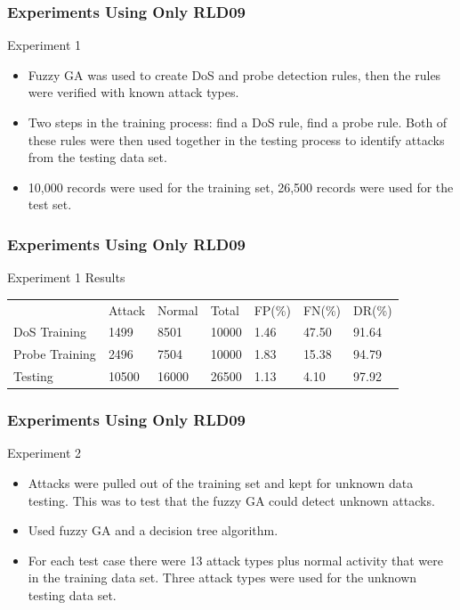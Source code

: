 \documentclass{beamer}
\begin{document}
\begin{frame}
	\frametitle{Experiments Using Only RLD09}
	Experiment 1
	\begin{itemize}
		\item Fuzzy GA was used to create DoS and probe detection rules, then the rules were verified with known attack types.
		\item Two steps in the training process: find a DoS rule, find a probe rule. Both of these rules were then used together in the testing process to identify attacks from the testing data set.
		\item 10,000 records were used for the training set, 26,500 records were used for the test set.
	\end{itemize}
\end{frame}


\begin{frame}
	\frametitle{Experiments Using Only RLD09}
	Experiment 1 Results
\begin{table}
\begin{small}
\begin{tabular}{lllllll}
 & Attack & Normal & Total & FP(\%) & FN(\%) & DR(\%)\\
DoS Training & 1499 & 8501 & 10000 & 1.46 & 47.50 & 91.64\\
Probe Training & 2496 & 7504 & 10000 & 1.83 & 15.38 & 94.79\\
Testing & 10500 & 16000 & 26500 & 1.13 & 4.10 & 97.92\\
\end{tabular}
\end{small}
\end{table}
\end{frame}


\begin{frame}
	\frametitle{Experiments Using Only RLD09}
Experiment 2
	\begin{itemize}
		\item Attacks were pulled out of the training set and kept for unknown data testing. This was to test that the fuzzy GA could detect unknown attacks.
		\item Used fuzzy GA and a decision tree algorithm.
		\item For each test case there were 13 attack types plus normal activity that were in the training data set. Three attack types were used for the unknown testing data set.
	\end{itemize}
\end{frame}
\end{document}
